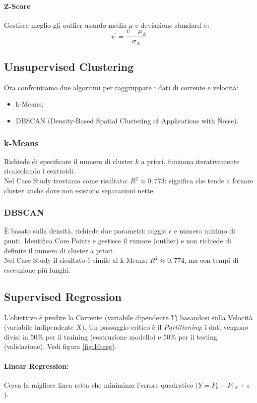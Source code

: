 \paragraph{Z-Score} Gestisce meglio gli outlier usando media $\mu$ e deviazione standard $\sigma$:
\[
    v^{\prime}=\frac{v-\mu_{A}}{\sigma_{A}}
\]

%
\subsection{Unsupervised Clustering}
Ora confrontiamo due algoritmi per raggruppare i dati di corrente e velocità:
\begin{itemize}
    \item k-Means;
    \item DBSCAN (Density-Based Spatial Clustering of Applications with Noise).
\end{itemize}

\subsubsection{k-Means}
Richiede di specificare il numero di cluster $k$ a priori, funziona iterativamente ricalcolando i centroidi.
\\Nel Case Study troviamo come risultato: $R^2 \approx 0,773$: significa che tende a forzare cluster anche dove non esistono separazioni nette.
\subsubsection{DBSCAN}
È basato sulla densità, richiede due parametri: raggio $\epsilon$ e numero minimo di punti. Identifica Core Points e gestisce il rumore (outlier) e non richiede di definire il numero di cluster a priori.
\\Nel Case Study il risultato è simile al k-Means: $R^2 \approx 0,774$, ma con tempi di esecuzione più lunghi.

%
\subsection{Supervised Regression}
L'obiettivo è predire la Corrente (variabile dipendente $Y$) basandosi sulla Velocità (variabile indipendente $X$).
Un passaggio critico è il \emph{Partitioning}: i dati vengono divisi in 50\% per il training (costruzione modello) e 50\% per il testing (validazione). Vedi figura \ref{fig:10-reg}.
%
\paragraph{Linear Regression:} Cerca la migliore linea retta che minimizza l'errore quadratico ($Y = P_{0} + P_{1X} + \epsilon$).

